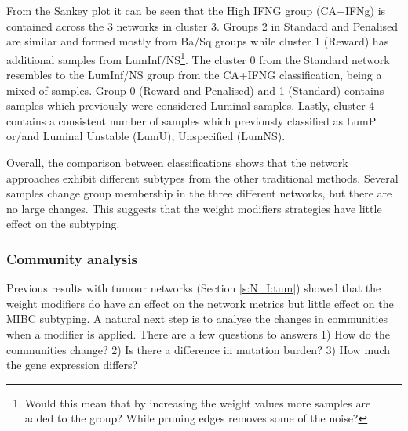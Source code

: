 From the Sankey plot it can be seen that the High IFNG group (CA+IFNg) is contained across the 3 networks in cluster 3. Groups 2 in Standard and Penalised are similar and formed mostly from Ba/Sq groups while cluster 1 (Reward) has additional samples from LumInf/NS\footnote{Would this mean that by increasing the weight values more samples are added to the group? While pruning edges removes some of the noise?}. The cluster 0 from the Standard network resembles to the LumInf/NS group from the CA+IFNG classification, being a mixed of samples. Group 0 (Reward and Penalised) and 1 (Standard) contains samples which previously were considered Luminal samples. Lastly, cluster 4 contains a consistent number of samples which previously classified as LumP or/and Luminal Unstable (LumU), Unspecified (LumNS).

Overall, the comparison between classifications shows that the network approaches exhibit different subtypes from the other traditional methods. Several samples change group membership in the three different networks, but there are no large changes. This suggests that the weight modifiers strategies have little effect on the subtyping.

\subsubsection{Community analysis}

Previous results with tumour networks (Section \ref{s:N_I:tum}) showed that the weight modifiers do have an effect on the network metrics but little effect on the MIBC subtyping. A natural next step is to analyse the changes in communities when a modifier is applied. There are a few questions to answers 1) How do the communities change? 2) Is there a difference in mutation burden? 3) How much the gene expression differs? 

